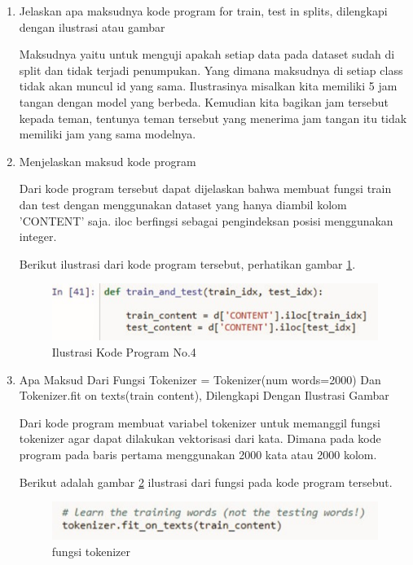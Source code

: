 \begin{enumerate}
\item Jelaskan apa maksudnya kode program for train, test in splits, dilengkapi dengan ilustrasi atau gambar
	\par Maksudnya yaitu untuk menguji apakah setiap data pada dataset sudah di split dan tidak terjadi penumpukan. Yang dimana maksudnya di setiap class tidak akan muncul id yang sama. Ilustrasinya misalkan kita memiliki 5 jam tangan dengan model yang berbeda. Kemudian kita bagikan jam tersebut kepada teman, tentunya teman tersebut yang menerima jam tangan itu tidak memiliki jam yang sama modelnya.
 

\item Menjelaskan maksud kode program
	
	\par Dari kode program tersebut dapat dijelaskan bahwa membuat fungsi train dan test dengan menggunakan dataset yang hanya diambil kolom 'CONTENT' saja. iloc berfingsi sebagai pengindeksan posisi menggunakan integer.
	
	\par Berikut ilustrasi dari kode program tersebut, perhatikan gambar \ref{no4}.
		\begin{figure}[!hbtp]
		\centering
		\includegraphics[scale=0.4]{figures/chapter7/no4.jpg}
		\caption{Ilustrasi Kode Program No.4}
		\label{no4}
		\end{figure}

\item Apa Maksud Dari Fungsi Tokenizer = Tokenizer(num words=2000) Dan Tokenizer.fit on texts(train content), Dilengkapi Dengan Ilustrasi Gambar
	
		
	\par Dari kode program  membuat variabel tokenizer untuk memanggil fungsi tokenizer agar dapat dilakukan vektorisasi dari kata. Dimana pada kode program pada baris pertama menggunakan 2000 kata atau 2000 kolom.
	
	
	\par Berikut adalah gambar  \ref{no5}  ilustrasi dari fungsi pada kode program tersebut.
	
		\begin{figure}[!hbtp]
		\centering
		\includegraphics[scale=0.4]{figures/chapter7/no5.jpg}
		\caption{fungsi tokenizer}
		\label{no5}
		\end{figure}


\end{enumerate}
